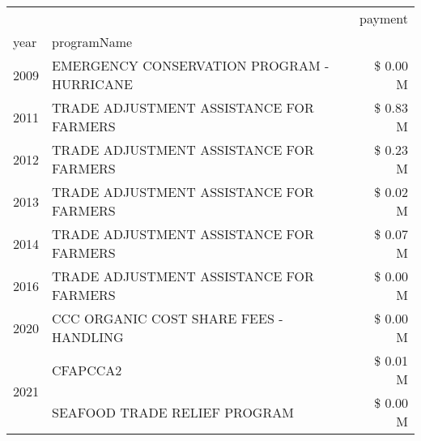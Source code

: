 \begin{tabular}{llr}
\toprule
 &  & payment \\
year & programName &  \\
\midrule
2009 & EMERGENCY CONSERVATION PROGRAM - HURRICANE & \$ 0.00 M \\
\cline{1-3}
2011 & TRADE ADJUSTMENT ASSISTANCE FOR FARMERS & \$ 0.83 M \\
\cline{1-3}
2012 & TRADE ADJUSTMENT ASSISTANCE FOR FARMERS & \$ 0.23 M \\
\cline{1-3}
2013 & TRADE ADJUSTMENT ASSISTANCE FOR FARMERS & \$ 0.02 M \\
\cline{1-3}
2014 & TRADE ADJUSTMENT ASSISTANCE FOR FARMERS & \$ 0.07 M \\
\cline{1-3}
2016 & TRADE ADJUSTMENT ASSISTANCE FOR FARMERS & \$ 0.00 M \\
\cline{1-3}
2020 & CCC ORGANIC COST SHARE FEES - HANDLING & \$ 0.00 M \\
\cline{1-3}
\multirow[t]{2}{*}{2021} & CFAPCCA2 & \$ 0.01 M \\
 & SEAFOOD TRADE RELIEF PROGRAM & \$ 0.00 M \\
\cline{1-3}
\bottomrule
\end{tabular}
